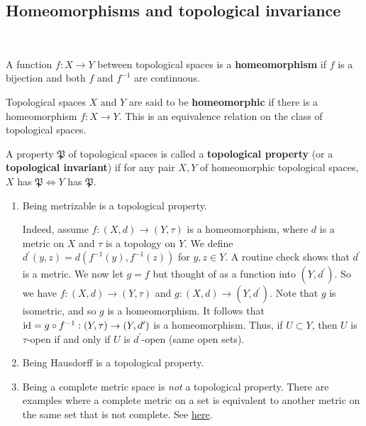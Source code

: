 \documentclass[a4paper,11pt]{article}
\begin{document}
\subsection{Homeomorphisms and topological invariance}\ \vspace{-1.5em}
\begin{definition}
    A function $f: X \rightarrow Y$ between topological spaces is a \textbf{homeomorphism} if $f$ is a bijection and both $f$ and $f^{-1}$ are continuous.

    Topological spaces $X$ and $Y$ are said to be \textbf{homeomorphic} if there is a homeomorphism $f: X \rightarrow Y$. This is an equivalence relation on the class of topological spaces.

    A property $\mathfrak{P}$ of topological spaces is called a \textbf{topological property} (or a \textbf{topological invariant}) if for any pair $X, Y$ of homeomorphic topological spaces, $X$ has $\mathfrak{P} \Longleftrightarrow Y$ has $\mathfrak{P}$. 
\end{definition}

\begin{example}
    \begin{enumerate}
        \item Being metrizable is a topological property.
        
        Indeed, assume $f:(X, d) \rightarrow(Y, \tau)$ is a homeomorphism, where $d$ is a metric on $X$ and $\tau$ is a topology on $Y$. We define $d^{\prime}(y, z)=d\left(f^{-1}(y), f^{-1}(z)\right)$ for $y, z \in Y$. A routine check shows that $d^{\prime}$ is a metric. We now let $g=f$ but thought of as a function into $\left(Y, d^{\prime}\right)$. So we have $f:(X, d) \rightarrow(Y, \tau)$ and $g:(X, d) \rightarrow\left(Y, d^{\prime}\right)$. Note that $g$ is isometric, and so $g$ is a homeomorphism. It follows that $\operatorname{id}=g \circ f^{-1}:(Y, \tau) \rightarrow\left(Y, d^{\prime}\right)$ is a homeomorphism. Thus, if $U \subset Y$, then $U$ is $\tau$-open if and only if $U$ is $d^{\prime}$-open (same open sets).
        \begin{center}
        \end{center}
        \item Being Hausdorff is a topological property.
        \item Being a complete metric space is \textit{not} a topological property. There are examples where a complete metric on a set is equivalent to another metric on the same set that is not complete. See \href{https://math.stackexchange.com/questions/1565350/why-is-completeness-not-a-topological-property}{here}.
      \end{enumerate}
\end{example}
\end{document}
